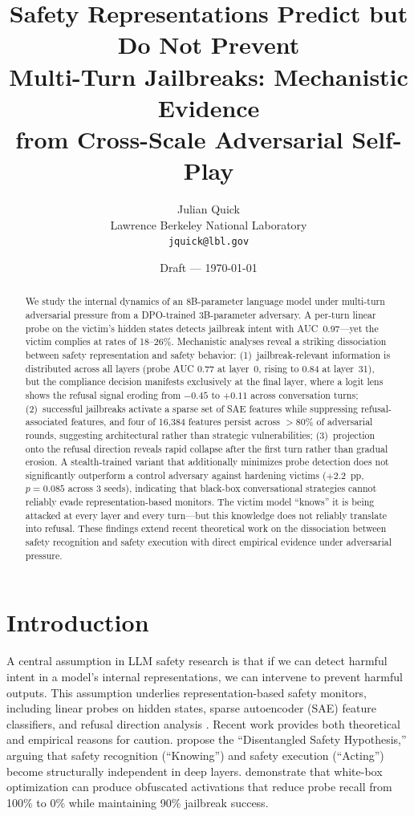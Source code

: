 \documentclass[11pt]{article}
\title{Safety Representations Predict but Do Not Prevent\\Multi-Turn Jailbreaks: Mechanistic Evidence\\from Cross-Scale Adversarial Self-Play}
\author{Julian Quick\\
  Lawrence Berkeley National Laboratory\\
  \texttt{jquick@lbl.gov}}
\date{Draft --- \today}
\begin{document}
\maketitle

\begin{abstract}
We study the internal dynamics of an 8B-parameter language model under multi-turn adversarial pressure from a DPO-trained 3B-parameter adversary.
A per-turn linear probe on the victim's hidden states detects jailbreak intent with AUC~0.97---yet the victim complies at rates of 18--26\%.
Mechanistic analyses reveal a striking dissociation between safety representation and safety behavior:
(1)~jailbreak-relevant information is distributed across all layers (probe AUC 0.77 at layer~0, rising to 0.84 at layer~31), but the compliance decision manifests exclusively at the final layer, where a logit lens shows the refusal signal eroding from $-0.45$ to $+0.11$ across conversation turns;
(2)~successful jailbreaks activate a sparse set of SAE features while suppressing refusal-associated features, and four of 16{,}384 features persist across $>$80\% of adversarial rounds, suggesting architectural rather than strategic vulnerabilities;
(3)~projection onto the refusal direction \citep{arditi2024refusal} reveals rapid collapse after the first turn rather than gradual erosion.
A stealth-trained variant that additionally minimizes probe detection does not significantly outperform a control adversary against hardening victims ($+2.2$~pp, $p=0.085$ across 3 seeds), indicating that black-box conversational strategies cannot reliably evade representation-based monitors.
The victim model ``knows'' it is being attacked at every layer and every turn---but this knowledge does not reliably translate into refusal.
These findings extend recent theoretical work on the dissociation between safety recognition and safety execution \citep{wu2026knowingwithoutacting} with direct empirical evidence under adversarial pressure.
\end{abstract}

\section{Introduction}
\label{sec:intro}

A central assumption in LLM safety research is that if we can detect harmful intent in a model's internal representations, we can intervene to prevent harmful outputs.
This assumption underlies representation-based safety monitors, including linear probes on hidden states, sparse autoencoder (SAE) feature classifiers, and refusal direction analysis \citep{arditi2024refusal}.
Recent work provides both theoretical and empirical reasons for caution.
\citet{wu2026knowingwithoutacting} propose the ``Disentangled Safety Hypothesis,'' arguing that safety recognition (``Knowing'') and safety execution (``Acting'') become structurally independent in deep layers.
\citet{bailey2024obfuscated} demonstrate that white-box optimization can produce obfuscated activations that reduce probe recall from 100\% to 0\% while maintaining 90\% jailbreak success.
\end{document}
